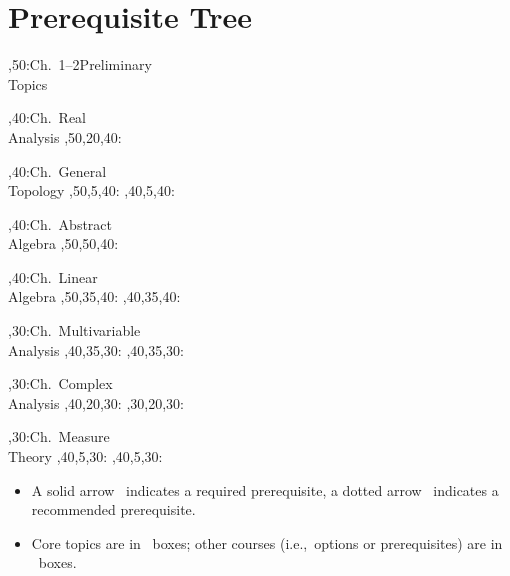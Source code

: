 \section*{Prerequisite Tree}

\vspace{2cm}

\setcounter{diagheight}{50}
\begin{chart}

,50:{Ch.\ 1--2}{Preliminary\\Topics}{}

,40:{Ch.\ }{Real\\Analysis}{}
  ,50,20,40:

,40:{Ch.\ }{General\\Topology}{}
  ,50,5,40:
  ,40,5,40:

,40:{Ch.\ }{Abstract\\Algebra}{}
  ,50,50,40:

,40:{Ch.\ }{Linear\\Algebra}{}
  ,50,35,40:
  ,40,35,40:

,30:{Ch.\ }{Multivariable\\Analysis}{}
  ,40,35,30:
  ,40,35,30:

,30:{Ch.\ }{Complex\\Analysis}{}
  ,40,20,30:
  ,30,20,30:

,30:{Ch.\ }{Measure\\Theory}{}
  ,40,5,30:
  ,40,5,30:



\end{chart}

\begin{center}
\begin{minipage}{6.0in}
\begin{itemize}
\item A solid arrow \solidarrow\  indicates a required prerequisite, a dotted arrow \dottedarrow\ indicates a recommended prerequisite.

\item Core topics are in \boldbox\ boxes; other courses (i.e.,~options or prerequisites) are in \lightbox\ boxes.
\end{itemize}
\end{minipage}
\end{center}